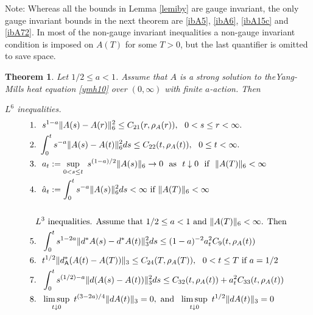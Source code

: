 \documentclass[12pt]{article}
\newtheorem{theorem}{Theorem}[section]
\def \As{\mathsf{A}}
\def \eref{\eqref}
\numberwithin{equation}{section}
\begin{document}
   


\bigskip
\noindent
Note: Whereas all  the bounds in Lemma \ref{lemiby}  are gauge invariant, 
the only gauge invariant bounds in the next theorem are \eref{ibA5}, \eref{ibA6}, \eref{ibA15c} and \eref{ibA72}.
In most of the non-gauge invariant inequalities a non-gauge invariant condition
 is imposed on $A(T)$ for some $T >0$, but  the last quantifier is omitted to save space.
         \begin{theorem}\label{thmibA1}  
Let $1/2 \le a <1$. Assume that $A$ is a strong solution to
 theYang-Mills heat equation \eref{ymh10} over $(0, \infty)$ with finite  $a$-action. 
Then



$L^6$ inequalities.
\begin{align}
&1.\ \  s^{1-a} \|A(s) - A(r)\|_6^2 \le C_{21}(r, \rho_A(r)), \ \ 0  <s \le r <\infty.               \label{ibA5} \\
&2.\ \int_0^t s^{-a} \| A(s)- A(t)\|_6^2 ds \le  C_{22}(t, \rho_A(t)),  \ \   0 \le t  < \infty.    \label{ibA6} \\ 
& 3.\ \  a_t := \sup_{0<s \le t}\  s^{(1-a)/2} \| A(s)\|_6 \rightarrow 0\ \ 
       \text{as}\ \ t\downarrow 0 \ \ \text{if}\ \ \|A(T)\|_6 < \infty                                         \label{ibA5a} \\
&4.\ \ \hat a_t :=    \int_0^t s^{-a} \| A(s)\|_6^2 ds < \infty\  \text{if}\  \|A(T)\|_6 < \infty   \label{ibA6a} \\
&\     \notag \\
&\ \ L^3 \text{ inequalities. Assume that $1/2 \le a <1$ and $\|A(T)\|_6 < \infty$. Then} \notag \\      
 &5. \ \  \int_0^t s^{1-2a}\|d^*A(s) - d^*A(t)\|_3^2 ds \le  (1-a)^{-2} a_t^2 C_9(t, \rho_A(t)) \label{ibA15b}\\        
 &6. \ \  t^{1/2}\| d_\As^* (A(t) - A(T)) \|_3 \le C_{24}(T, \rho_A(T)),\ \  0<t \le T\ \text{if}\ a = 1/2  \label{ibA15c} \\
&7. \ \ \int_0^t   s^{(1/2) -a}    \|d(A(s) - A(t))\|_3^2 ds  \le  C_{32}(t, \rho_A(t)) + a_t^2C_{33}(t, \rho_A(t))
                                                                   \label{ibA10a} \\
&8.
\ \ \limsup_{t\downarrow 0 }\ t^{(3-2a)/4}  \| d A(t)\|_3  = 0,\ \text{and}\ \   
\limsup_{t\downarrow 0 }\ t^{1/2}  \| d A(t)\|_3  = 0                                             \label{ibA14}  \\
&\    \notag \\

\end{align}
\end{theorem}
\end{document}
